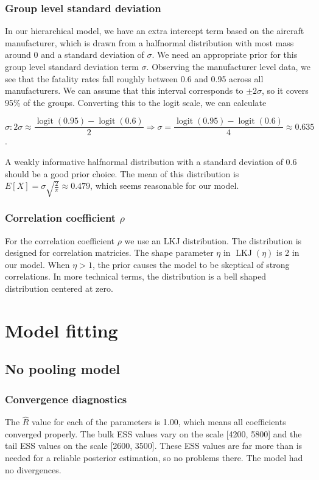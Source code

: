 \documentclass[12pt,a4paper]{article}
\begin{document}
\subsubsection*{Group level standard deviation}
In our hierarchical model, we have an extra intercept term based on the aircraft manufacturer, which is drawn from a halfnormal distribution with most mass around 0 and a standard deviation of $\sigma$. We need an appropriate prior for this group level standard deviation term $\sigma$. Observing the manufacturer level data, we see that the fatality rates fall roughly between 0.6 and 0.95 across all manufacturers. We can assume that this interval corresponds to $\pm2\sigma$, so it covers 95\% of the groups. Converting this to the logit scale, we can calculate

$$\sigma: 2\sigma \approx \frac{\operatorname{logit}(0.95) - \operatorname{logit}(0.6)}{2} \Rightarrow \sigma = \frac{\operatorname{logit}(0.95) - \operatorname{logit}(0.6)}{4} \approx 0.635$$.

A weakly informative halfnormal distribution with a standard deviation of 0.6 should be a good prior choice. The mean of this distribution is $E[X] = \sigma\sqrt{\frac{2}{\pi}} \approx 0.479$, which seems reasonable for our model.

\subsubsection*{Correlation coefficient $\rho$}

For the correlation coefficient $\rho$ we use an LKJ distribution. The distribution is designed for correlation matricies. The shape parameter $\eta$ in $\operatorname{LKJ}(\eta)$ is 2 in our model. When $\eta>1$, the prior causes the model to be skeptical of strong correlations. In more technical terms, the distribution is a bell shaped distribution centered at zero.


\section{Model fitting}
\subsection{No pooling model}

\subsubsection*{Convergence diagnostics}
The \(\hat{R}\) value for each of the parameters is 1.00, which means all coefficients converged properly. The bulk ESS values vary on the scale [4200, 5800] and the tail ESS values on the scale [2600, 3500]. These ESS values are far more than is needed for a reliable posterior estimation, so no problems there. The model had no divergences.
\end{document}
